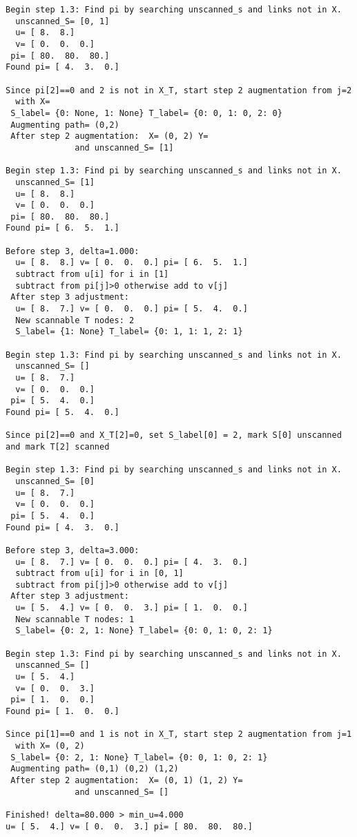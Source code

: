 \documentclass[11pt]{article}
\begin{document}
\begin{verbatim}
Begin step 1.3: Find pi by searching unscanned_s and links not in X.
  unscanned_S= [0, 1]
  u= [ 8.  8.]
  v= [ 0.  0.  0.]
 pi= [ 80.  80.  80.]
Found pi= [ 4.  3.  0.]

Since pi[2]==0 and 2 is not in X_T, start step 2 augmentation from j=2
  with X= 
 S_label= {0: None, 1: None} T_label= {0: 0, 1: 0, 2: 0}
 Augmenting path= (0,2) 
 After step 2 augmentation:  X= (0, 2) Y= 
              and unscanned_S= [1]

Begin step 1.3: Find pi by searching unscanned_s and links not in X.
  unscanned_S= [1]
  u= [ 8.  8.]
  v= [ 0.  0.  0.]
 pi= [ 80.  80.  80.]
Found pi= [ 6.  5.  1.]

Before step 3, delta=1.000:
  u= [ 8.  8.] v= [ 0.  0.  0.] pi= [ 6.  5.  1.]
  subtract from u[i] for i in [1]
  subtract from pi[j]>0 otherwise add to v[j]
 After step 3 adjustment:
  u= [ 8.  7.] v= [ 0.  0.  0.] pi= [ 5.  4.  0.]
  New scannable T nodes: 2 
  S_label= {1: None} T_label= {0: 1, 1: 1, 2: 1}

Begin step 1.3: Find pi by searching unscanned_s and links not in X.
  unscanned_S= []
  u= [ 8.  7.]
  v= [ 0.  0.  0.]
 pi= [ 5.  4.  0.]
Found pi= [ 5.  4.  0.]

Since pi[2]==0 and X_T[2]=0, set S_label[0] = 2, mark S[0] unscanned
and mark T[2] scanned

Begin step 1.3: Find pi by searching unscanned_s and links not in X.
  unscanned_S= [0]
  u= [ 8.  7.]
  v= [ 0.  0.  0.]
 pi= [ 5.  4.  0.]
Found pi= [ 4.  3.  0.]

Before step 3, delta=3.000:
  u= [ 8.  7.] v= [ 0.  0.  0.] pi= [ 4.  3.  0.]
  subtract from u[i] for i in [0, 1]
  subtract from pi[j]>0 otherwise add to v[j]
 After step 3 adjustment:
  u= [ 5.  4.] v= [ 0.  0.  3.] pi= [ 1.  0.  0.]
  New scannable T nodes: 1 
  S_label= {0: 2, 1: None} T_label= {0: 0, 1: 0, 2: 1}

Begin step 1.3: Find pi by searching unscanned_s and links not in X.
  unscanned_S= []
  u= [ 5.  4.]
  v= [ 0.  0.  3.]
 pi= [ 1.  0.  0.]
Found pi= [ 1.  0.  0.]

Since pi[1]==0 and 1 is not in X_T, start step 2 augmentation from j=1
  with X= (0, 2) 
 S_label= {0: 2, 1: None} T_label= {0: 0, 1: 0, 2: 1}
 Augmenting path= (0,1) (0,2) (1,2) 
 After step 2 augmentation:  X= (0, 1) (1, 2) Y= 
              and unscanned_S= []

Finished! delta=80.000 > min_u=4.000
u= [ 5.  4.] v= [ 0.  0.  3.] pi= [ 80.  80.  80.]
\end{verbatim}
\end{document}
